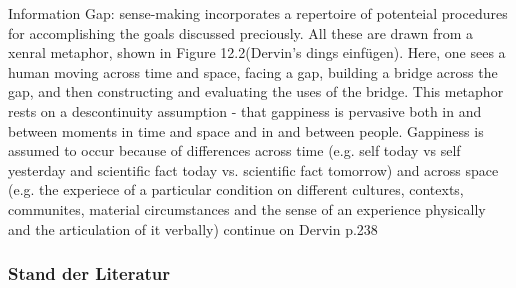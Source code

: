 Information Gap:
\cite{dervin2003sense}sense-making incorporates a repertoire of potenteial procedures for accomplishing the goals discussed preciously. All these are drawn from a xenral metaphor, shown in Figure 12.2(Dervin's dings einfügen). Here, one sees a human moving across time and space, facing a gap, building a bridge across the gap, and then constructing and evaluating the uses of the bridge. This metaphor rests on a descontinuity assumption - that gappiness is pervasive both in and between moments in time and space and in and between people. Gappiness is assumed to occur because of differences across time (e.g. self today vs self yesterday and scientific fact today vs. scientific fact tomorrow) and across space (e.g. the experiece of a particular condition on different cultures, contexts, communites, material circumstances and the sense of an experience physically and the articulation of it verbally)
continue on Dervin p.238


\subsubsection{Stand der Literatur}

